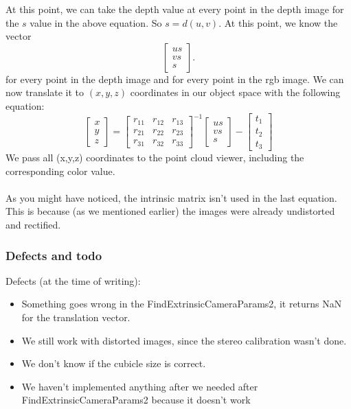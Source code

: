 At this point, we can take the depth value at every point in the depth image for
the $s$ value in the above equation. So $s = d(u,v)$. At this point, we know
the vector $$
\left[ \begin{array}{ccc} 
u s\\
v s\\
s \end{array} \right].
$$ for every point in the depth image and for every point in the rgb image. We 
can now translate it to $(x,y,z)$ coordinates in our object space with the 
following equation:
$$
\left[ \begin{array}{c} 
x\\
y\\
z\end{array} \right] 
=
\left[ \begin{array}{ccc} 
r_{11} & r_{12} & r_{13}\\
r_{21} & r_{22} & r_{23}\\
r_{31} & r_{32} & r_{33}
\end{array} \right]^{-1}
\left[ \begin{array}{c} 
u s\\
v s\\
s \end{array} \right]
-
\left[ \begin{array}{c} 
t_{1}\\
t_{2}\\
t_{3}
\end{array} \right]
$$
We pass all (x,y,z) coordinates to the point cloud viewer, including 
the corresponding color value. \\
\\
As you might have noticed, the intrinsic matrix isn't used in the last equation.
This is because (as we mentioned earlier) the images were already undistorted
and rectified.

\subsubsection{Defects and todo}

Defects (at the time of writing):

\begin{itemize}

\item Something goes wrong in the FindExtrinsicCameraParams2, it returns NaN for the translation vector.

\item We still work with distorted images, since the stereo calibration wasn't done.

\item We don't know if the cubicle size is correct.

\item We haven't implemented anything after we needed after FindExtrinsicCameraParams2 because it doesn't work

\end{itemize}

